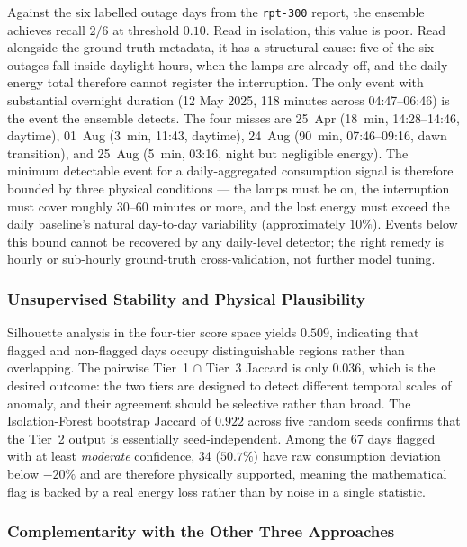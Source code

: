 \documentclass{article}
\begin{document}
Against the six labelled outage days from the \texttt{rpt-300} report, the ensemble achieves recall $2/6$ at threshold $0.10$. Read in isolation, this value is poor. Read alongside the ground-truth metadata, it has a structural cause: five of the six outages fall inside daylight hours, when the lamps are already off, and the daily energy total therefore cannot register the interruption. The only event with substantial overnight duration (12 May 2025, 118 minutes across 04:47--06:46) is the event the ensemble detects. The four misses are 25~Apr (18~min, 14:28--14:46, daytime), 01~Aug (3~min, 11:43, daytime), 24~Aug (90~min, 07:46--09:16, dawn transition), and 25~Aug (5~min, 03:16, night but negligible energy). The minimum detectable event for a daily-aggregated consumption signal is therefore bounded by three physical conditions --- the lamps must be on, the interruption must cover roughly 30--60 minutes or more, and the lost energy must exceed the daily baseline's natural day-to-day variability (approximately $10\%$). Events below this bound cannot be recovered by any daily-level detector; the right remedy is hourly or sub-hourly ground-truth cross-validation, not further model tuning.

\subsubsection{Unsupervised Stability and Physical Plausibility}

Silhouette analysis \cite{rousseeuw1987silhouettes} in the four-tier score space yields $0.509$, indicating that flagged and non-flagged days occupy distinguishable regions rather than overlapping. The pairwise Tier~1 $\cap$ Tier~3 Jaccard is only $0.036$, which is the desired outcome: the two tiers are designed to detect different temporal scales of anomaly, and their agreement should be selective rather than broad. The Isolation-Forest bootstrap Jaccard of $0.922$ across five random seeds confirms that the Tier~2 output is essentially seed-independent. Among the 67 days flagged with at least \textit{moderate} confidence, 34 ($50.7\%$) have raw consumption deviation below $-20\%$ and are therefore physically supported, meaning the mathematical flag is backed by a real energy loss rather than by noise in a single statistic.

\subsubsection{Complementarity with the Other Three Approaches}
\end{document}

